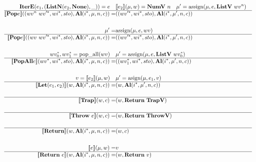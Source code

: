 \begin{align*}
%
\newline \\
  \textbf{IterE}(e_1, (\textbf{ListN}(e_2, \textbf{None}), \_))=e \quad&
  \sem{e_2}(\mu, w) = \textbf{NumV} ~ n \quad
  \mu' = \text{assign}(\mu, e, \textbf{ListV} ~ wv^n) \\
  \hline
  \sem{\textbf{Pop} e}((wv^n ~ \seq{wv'}, \seq{wi}, sto), \al (\seq{i}, \mu, n, c))
  =&
  ((\seq{wv'}, \seq{wi}, sto), \al (\seq{i}, \mu', n, c)) \\
%
\newline \\
  \mu' =& \text{assign}(\mu, e, wv) \\
  \hline
  \sem{\textbf{Pop} e}((wv ~ \seq{wv'}, \seq{wi}, sto), \al (\seq{i}, \mu, n, c))
  =&
  ((\seq{wv'}, \seq{wi}, sto), \al (\seq{i}, \mu', n, c)) \\
%
\newline \\
  \seq{wv_0}, \seq{wv_1} = \text{pop\_all}(wv) \quad& \mu' = \text{assign}(\mu, e, \textbf{ListV} ~ \seq{wv_0}) \\
  \hline
  \sem{\textbf{PopAll} e}(\seq{wv}, \seq{wi}, sto), \al (\seq{i}, \mu, n, c))
  =&
  ((\seq{wv_1}, \seq{wi}, sto), \al (\seq{i}, \mu', n, c)) \\
%
\newline \\
  v = \sem{e_2}(\mu, w) \quad& \mu' = \text{asign}(\mu, e_1, v) \\
  \hline
  \sem{\textbf{Let}(e_1, e_2)}(w, \al (\seq{i}, \mu, n, c))
  =&
  (w, \al (\seq{i}, \mu', n, c)) \\
%
\newline \\
  \hline
  \sem{\textbf{Trap}}(w, c) =& (w, \ret ~ \textbf{TrapV}) \\
%
\newline \\
  \hline
  \sem{\textbf{Throw} ~ e}(w, c) =& (w, \ret ~ \textbf{ThrowV}) \\
%
\newline \\
  \hline
  \sem{\textbf{Return}}(w, \al (\seq{i}, \mu, n, c)) =& (w, c) \\
%
\newline \\
  \sem{e}(\mu, w) =& v \\
  \hline
  \sem{\textbf{Return} ~ e}(w, \al (\seq{i}, \mu, n, c)) =& (w, \ret ~ v) \\

\end{align*}
